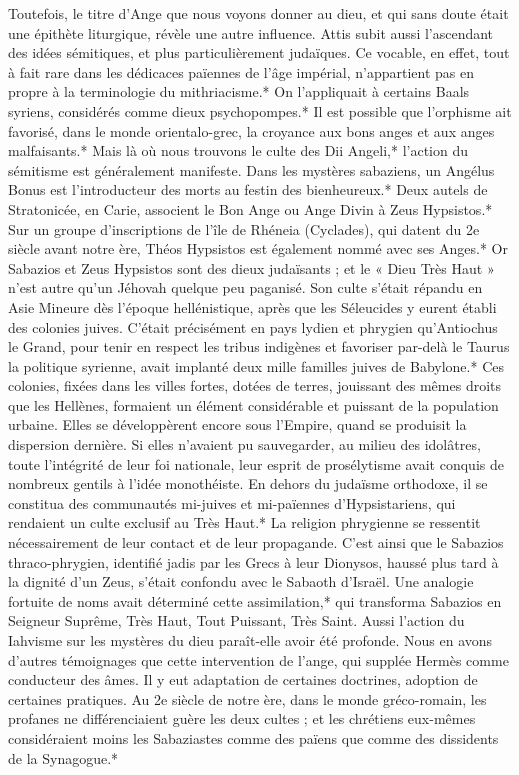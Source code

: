 \documentclass[a4paper, 11pt, oneside, polutonikogreek, french]{article}
\begin{document}
Toutefois, le titre d'Ange que nous voyons donner au dieu, et qui sans doute était une épithète liturgique, révèle une autre influence. Attis subit aussi l'ascendant des idées sémitiques, et plus particulièrement judaïques. Ce vocable, en effet, tout à fait rare dans les dédicaces païennes de l'âge impérial, n'appartient pas en propre à la terminologie du mithriacisme.* On l'appliquait à certains Baals syriens, considérés comme dieux psychopompes.* Il est possible que l'orphisme ait favorisé, dans le monde orientalo-grec, la croyance aux bons anges et aux anges malfaisants.* Mais là où nous trouvons le culte des Dii Angeli,* l'action du sémitisme est généralement manifeste. Dans les mystères sabaziens, un Angélus Bonus est l'introducteur des morts au festin des bienheureux.* Deux autels de Stratonicée, en Carie, associent le Bon Ange ou Ange Divin à Zeus Hypsistos.* Sur un groupe d'inscriptions de l'île de Rhéneia (Cyclades), qui datent du 2e siècle avant notre ère, Théos Hypsistos est également nommé avec ses Anges.* Or Sabazios et Zeus Hypsistos sont des dieux judaïsants ; et le « Dieu Très Haut » n'est autre qu'un Jéhovah quelque peu paganisé. Son culte s'était répandu en Asie Mineure dès l'époque hellénistique, après que les Séleucides y eurent établi des colonies juives. C'était précisément en pays lydien et phrygien qu'Antiochus le Grand, pour tenir en respect les tribus indigènes et favoriser par-delà le Taurus la politique syrienne, avait implanté deux mille familles juives de Babylone.* Ces colonies, fixées dans les villes fortes, dotées de terres, jouissant des mêmes droits que les Hellènes, formaient un élément considérable et puissant de la population urbaine. Elles se développèrent encore sous l'Empire, quand se produisit la dispersion dernière. Si elles n'avaient pu sauvegarder, au milieu des idolâtres, toute l'intégrité de leur foi nationale, leur esprit de prosélytisme avait conquis de nombreux gentils à l'idée monothéiste. En dehors du judaïsme orthodoxe, il se constitua des communautés mi-juives et mi-païennes d'Hypsistariens, qui rendaient un culte exclusif au Très Haut.* La religion phrygienne se ressentit nécessairement de leur contact et de leur propagande. C'est ainsi que le Sabazios thraco-phrygien, identifié jadis par les Grecs à leur Dionysos, haussé plus tard à la dignité d'un Zeus, s'était confondu avec le Sabaoth d'Israël. Une analogie fortuite de noms avait déterminé cette assimilation,* qui transforma Sabazios en Seigneur Suprême, Très Haut, Tout Puissant, Très Saint. Aussi l'action du Iahvisme sur les mystères du dieu paraît-elle avoir été profonde. Nous en avons d'autres témoignages que cette intervention de l'ange, qui supplée Hermès comme conducteur des âmes. Il y eut adaptation de certaines doctrines, adoption de certaines pratiques. Au 2e siècle de notre ère, dans le monde gréco-romain, les profanes ne différenciaient guère les deux cultes ; et les chrétiens eux-mêmes considéraient moins les Sabaziastes comme des païens que comme des dissidents de la Synagogue.*
\end{document}
